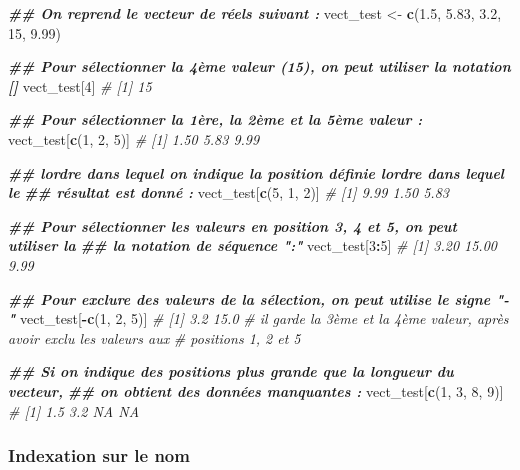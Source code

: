 \documentclass[
]{book}
\newenvironment{Shaded}{\begin{snugshade}}{\end{snugshade}}
\newcommand{\CommentTok}[1]{\textcolor[rgb]{0.56,0.35,0.01}{\textit{#1}}}
\newcommand{\DecValTok}[1]{\textcolor[rgb]{0.00,0.00,0.81}{#1}}
\newcommand{\DocumentationTok}[1]{\textcolor[rgb]{0.56,0.35,0.01}{\textbf{\textit{#1}}}}
\newcommand{\FloatTok}[1]{\textcolor[rgb]{0.00,0.00,0.81}{#1}}
\newcommand{\FunctionTok}[1]{\textcolor[rgb]{0.13,0.29,0.53}{\textbf{#1}}}
\newcommand{\NormalTok}[1]{#1}
\newcommand{\OtherTok}[1]{\textcolor[rgb]{0.56,0.35,0.01}{#1}}
\newcommand{\SpecialCharTok}[1]{\textcolor[rgb]{0.81,0.36,0.00}{\textbf{#1}}}
\begin{document}
\begin{Shaded}
\begin{Highlighting}[]
\DocumentationTok{\#\# On reprend le vecteur de réels suivant :}
\NormalTok{vect\_test }\OtherTok{\textless{}{-}} \FunctionTok{c}\NormalTok{(}\FloatTok{1.5}\NormalTok{, }\FloatTok{5.83}\NormalTok{, }\FloatTok{3.2}\NormalTok{, }\DecValTok{15}\NormalTok{, }\FloatTok{9.99}\NormalTok{)}

\DocumentationTok{\#\# Pour sélectionner la 4ème valeur (15), on peut utiliser la notation []}
\NormalTok{vect\_test[}\DecValTok{4}\NormalTok{]}
\CommentTok{\# [1] 15}

\DocumentationTok{\#\# Pour sélectionner la 1ère, la 2ème et la 5ème valeur : }
\NormalTok{vect\_test[}\FunctionTok{c}\NormalTok{(}\DecValTok{1}\NormalTok{, }\DecValTok{2}\NormalTok{, }\DecValTok{5}\NormalTok{)]}
\CommentTok{\# [1] 1.50 5.83 9.99}

\DocumentationTok{\#\# l\textquotesingle{}ordre dans lequel on indique la position définie l\textquotesingle{}ordre dans lequel le }
\DocumentationTok{\#\# résultat est donné :}
\NormalTok{vect\_test[}\FunctionTok{c}\NormalTok{(}\DecValTok{5}\NormalTok{, }\DecValTok{1}\NormalTok{, }\DecValTok{2}\NormalTok{)]}
\CommentTok{\# [1] 9.99 1.50 5.83}

\DocumentationTok{\#\# Pour sélectionner les valeurs en position 3, 4 et 5, on peut utiliser la }
\DocumentationTok{\#\# la notation de séquence ":"}
\NormalTok{vect\_test[}\DecValTok{3}\SpecialCharTok{:}\DecValTok{5}\NormalTok{]}
\CommentTok{\# [1]  3.20 15.00  9.99}

\DocumentationTok{\#\# Pour exclure des valeurs de la sélection, on peut utilise le signe "{-}"}
\NormalTok{vect\_test[}\SpecialCharTok{{-}}\FunctionTok{c}\NormalTok{(}\DecValTok{1}\NormalTok{, }\DecValTok{2}\NormalTok{, }\DecValTok{5}\NormalTok{)]}
\CommentTok{\# [1]  3.2 15.0     }
\CommentTok{\# il garde la 3ème et la 4ème valeur, après avoir exclu les valeurs aux }
\CommentTok{\# positions 1, 2 et 5}

\DocumentationTok{\#\# Si on indique des positions plus grande que la longueur du vecteur, }
\DocumentationTok{\#\# on obtient des données manquantes : }
\NormalTok{vect\_test[}\FunctionTok{c}\NormalTok{(}\DecValTok{1}\NormalTok{, }\DecValTok{3}\NormalTok{, }\DecValTok{8}\NormalTok{, }\DecValTok{9}\NormalTok{)]}
\CommentTok{\# [1] 1.5 3.2  NA  NA}
\end{Highlighting}
\end{Shaded}

\subsubsection{Indexation sur le nom}\label{indexation-sur-le-nom}
\end{document}
